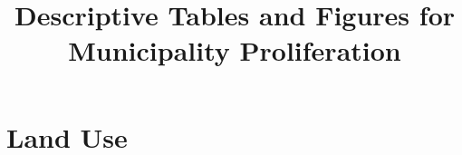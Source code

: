 \documentclass{article}
\title{Descriptive Tables and Figures for Municipality Proliferation}
\begin{document}
\maketitle
\tableofcontents
{\footnotesize 
\listoffigures
\listoftables}
\clearpage

\section{Land Use}

\clearpage

\clearpage

\clearpage

\clearpage

\clearpage

\clearpage

\clearpage

\clearpage

\clearpage

\clearpage

\clearpage

\clearpage
\end{document}

